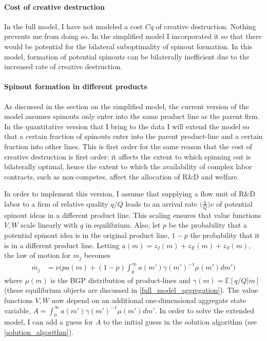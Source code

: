 \documentclass[12pt,english]{article}
\theoremstyle{remark}
\begin{document}
\paragraph{Cost of creative destruction}

In the full model, I have not modeled a cost $Cq$ of creative destruction. Nothing prevents me from doing so. In the simplified model I incorporated it so that there would be potential for the bilateral suboptimality of spinout formation. In this model, formation of potential spinouts can be bilaterally inefficient due to the increased rate of creative destruction.

\paragraph{Spinout formation in different products}

As discussed in the section on the simplified model, the current version of the model assumes spinouts only enter into the same product line as the parent firm. In the quantitative version that I bring to the data I will extend the model so that a certain fraction of spinouts enter into the parent product-line and a certain fraction into other lines. This is first order for the same reason that the cost of creative destruction is first order: it affects the extent to which spinning out is bilaterally optimal, hence the extent to which the availability of complex labor contracts, such as non-competes, affect the allocation of R\&D and welfare. 

In order to implement this version, I assume that supplying a flow unit of R\&D labor to a firm of relative quality $q/Q$ leads to an arrival rate $\Big(\frac{q}{Q}\Big) \nu$ of potential spinout ideas in a different product line. This scaling ensures that value functions $V,W$ scale linearly with $q$ in equilibrium. Also, let $p$ be the probability that a potential spinout idea is in the original product line, $1-p$ the probability that it is in a different product line. Letting $a(m) = z_I(m) + z_E(m) + z_S(m)$, the law of motion for $m_j$ becomes
\begin{align}
\dot{m_j} &= \nu \Big(p a(m) + (1-p) \int_0^{\infty} a(m') \gamma(m')^{-1} \mu(m') dm'  \Big)  \label{mj_law_of_motion_outOfIndustrySpinouts}
\end{align}
where $\mu(m)$ is the BGP distribution of product-lines and $\gamma(m) = \mathbb{E}[q/Q|m]$ (these equilibrium objects are discussed in \ref{full_model_aggregation}). The value functions $V,W$ now depend on an additional one-dimensional aggregate state variable, $A = \int_0^{\infty} a(m') \gamma(m')^{-1} \mu(m') dm'$. In order to solve the extended model, I can add a guess for $A$ to the initial guess in the solution algorithm (see \ref{solution_algorithm}). 
\end{document}
